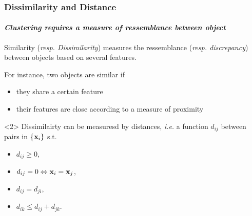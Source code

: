 \documentclass{beamer}\usepackage[]{graphicx}\usepackage[]{color}
\begin{document}
\begin{frame}
  \frametitle{Dissimilarity and Distance}

  \paragraph{\it Clustering requires a measure of ressemblance between object}

  \begin{definition}
    Similarity (\textit{resp. Dissimilarity}) measures the ressemblance (\textit{resp. discrepancy}) between objects based on several features. 
  \end{definition}

  For instance, two objects are similar if 
  \begin{itemize}
    \item they share a certain feature
    \item \alert{their features are close according to a measure of proximity}
  \end{itemize}
  
  \vfill
  
  \begin{definition}<2>
    Dissimilairty can be measuresd by distances, \textit{i.e.} a function $d_{ij}$ between pairs in \{$\mathbf{x}_i\}$ s.t.
    \vspace{-.25cm}
    \begin{multicols}{2}
    \begin{itemize}
      \item $d_{ij} \geq 0$,
      \item $d_{ij} = 0 \Leftrightarrow \mathbf{x}_i = \mathbf{x}_{j}$,
      \item $d_{ij} = d_{ji}$,
      \item $d_{ik} \leq d_{ij} + d_{jk}$.
    \end{itemize}
    \end{multicols}
  \end{definition}

\end{frame}
\end{document}
